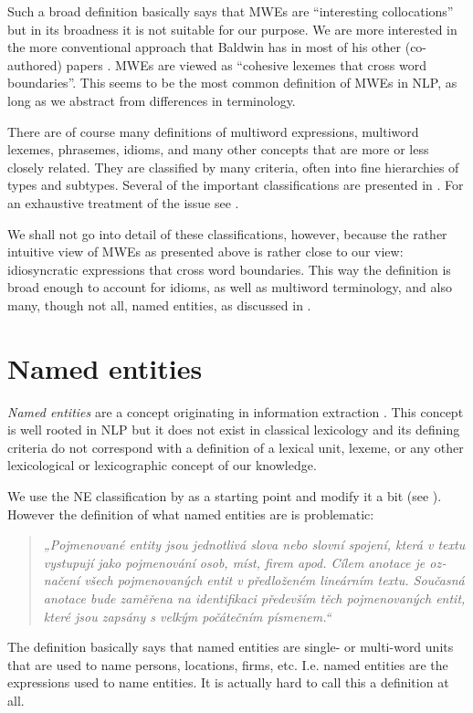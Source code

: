 Such a broad definition basically says that MWEs are ``interesting collocations'' but in its broadness it is not suitable for our purpose. We are more interested in the more conventional approach that Baldwin has in most of his other (co-authored) papers \citep{baldwin:2003,sag:2002}. MWEs are viewed as ``cohesive lexemes that cross word boundaries''. This seems to be the most common definition of MWEs in NLP, as long as we abstract from differences in terminology.

There are of course many definitions of multiword expressions, multiword lexemes, phrasemes, idioms, and many other concepts that are more or less closely related. They are classified by many criteria, often into fine hierarchies of types and subtypes. Several of the important classifications are presented in \citet{pecina:2009}. For an exhaustive treatment of the issue see \citet{cermak:2010}. 

We shall not go into detail of these classifications, however, because the rather intuitive view of MWEs as presented above is rather close to our view: idiosyncratic expressions that cross word boundaries. This way the definition is broad enough to account for idioms, as well as multiword terminology, and also many, though not all, named entities, as discussed in .


\section{Named entities}
\label{mwe:ne}
\emph{Named entities} are a concept originating in information extraction \citep{salp}. This concept is well rooted in NLP but it does not exist in classical lexicology and its defining criteria do not correspond with a definition of a lexical unit, lexeme, or any other lexicological or lexicographic concept of our knowledge.

We use the NE classification by \citet{sevcikova:2007} as a starting point and modify it a bit (see ). However the definition of what named entities are is problematic:
\begin{quote}
\textczech{\em „Pojmenované entity jsou jednotlivá slova nebo slovní spojení, která v textu vystupují jako
pojmenování osob, míst, firem apod. Cílem anotace je označení všech pojmenovaných entit v 
předloženém lineárním textu. Současná anotace bude zaměřena na identifikaci
především těch pojmenovaných entit, které jsou zapsány s velkým počátečním písmenem.“}
\end{quote}
The definition basically says that named entities are single- or multi-word units that are used to name persons, locations, firms, etc. I.e. named entities are the expressions used to name entities. It is actually hard to call this a definition at all.

